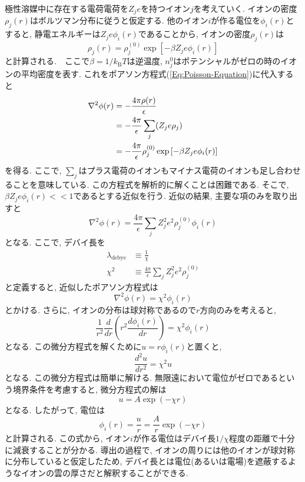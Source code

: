 極性溶媒中に存在する電荷電荷を$Z_{j} e$を持つイオン$j$を考えていく.
イオンの密度$\rho_{j}(r)$はボルツマン分布に従うと仮定する. 
他のイオン$i$が作る電位を$\phi_{i}(r)$とすると, 静電エネルギーは$Z_{j}e \phi_{i}(r)$であることから, イオンの密度$\rho_{j}(r)$は
\begin{equation}
    \rho_{j}(r) =
    \rho_{j}^{(0)} \exp\left[-\beta Z_{j}e \phi_{i}(r)\right]
\end{equation}
と計算される.　ここで$\beta = 1/k_{\mathrm{B}}T$は逆温度, $n_{j}^{0}$はポテンシャルがゼロの時のイオンの平均密度を表す. 
これをポアソン方程式(\ref{Eq:Poisson-Equation})に代入すると
\begin{align}
    \nabla^{2} \phi(r)
    &=
    - \frac{4\pi\rho(r)}{\epsilon}
    \notag \\
    &=
    - \frac{4\pi}{\epsilon} \sum_{j}(Z_{j} e \rho_{j})
    \notag \\
    &=
    - \frac{4\pi}{\epsilon}
    \rho_{j}^{(0)} \exp\left[-\beta Z_{j}e \phi_{i}(r)\right]
\end{align}
を得る. ここで, $\sum_{j}$はプラス電荷のイオンもマイナス電荷のイオンも足し合わせることを意味している. この方程式を解析的に解くことは困難である. そこで, $\beta Z_{j} e \phi_{i}(r) << 1$であるとする近似を行う. 近似の結果, 主要な項のみを取り出すと
\begin{equation}
    \nabla^{2} \phi(r)
    =
    \frac{4\pi}{\epsilon}
    \sum_{j} Z_{j}^{2} e^{2} \rho_{j}^{(0)} \phi_{i}(r)
\end{equation}
となる. ここで, デバイ長を
\begin{align}
    \lambda_{\mathrm{debye}} &\equiv \frac{1}{\chi} 
    \\
    \chi^{2} &\equiv 
    \frac{4\pi}{\epsilon}
    \sum_{j} Z_{j}^{2} e^{2} \rho_{j}^{(0)}
\end{align}
と定義すると, 近似したポアソン方程式は
\begin{equation}
    \nabla^{2} \phi(r) = \chi^{2} \phi_{i}(r)
\end{equation}
とかける. さらに, イオンの分布は球対称であるので$r$方向のみを考えると,
\begin{equation}
    \frac{1}{r^{2}} \frac{d}{dr}
    \left(
        r^{2}
        \frac{d\phi_{i}(r)}{dr}
    \right)
    =
    \chi^{2} \phi_{i}(r)
\end{equation}
となる. この微分方程式を解くために$u = r \phi_{i}(r)$と置くと,
\begin{equation}
    \frac{d^{2} u}{dr^{2}} = \chi^{2} u
\end{equation}
となる. この微分方程式は簡単に解ける.
無限遠において電位がゼロであるという境界条件を考慮すると, 微分方程式の解は
\begin{equation}
    u = A \exp(-\chi r)
\end{equation}
となる. したがって, 電位は
\begin{equation}
    \phi_{i}(r) = \frac{u}{r} = \frac{A}{r} \exp(-\chi r)
\end{equation}
と計算される. この式から, イオン$i$が作る電位はデバイ長$1/\chi$程度の距離で十分に減衰することが分かる. 導出の過程で, イオンの周りには他のイオンが球対称に分布していると仮定したため, デバイ長とは電位(あるいは電場)を遮蔽するようなイオンの雲の厚さだと解釈することができる.

